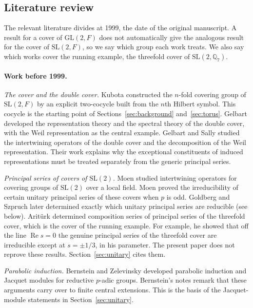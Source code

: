 \documentclass[12pt,letterpaper]{article}
\numberwithin{equation}{section}
\theoremstyle{plain}
\theoremstyle{definition}
\theoremstyle{remark}
\newcommand{\Qq}{\mathbb Q}
\newcommand{\SL}{\mathrm{SL}}
\newcommand{\GL}{\mathrm{GL}}
\begin{document}
\subsection{Literature review}\label{sec:literature}
The relevant literature divides at 1999, the date of the original
manuscript. A result for a cover of $\GL(2,F)$ does not automatically
give the analogous result for the cover of $\SL(2,F)$, so we say which
group each work treats. We also say which works cover the running
example, the threefold cover of $\SL(2,\Qq_7)$.

\paragraph{Work before 1999.}
\emph{The cover and the double cover.} Kubota \cite{Ku67}
constructed the $n$-fold covering group of $\SL(2,F)$ by an explicit
two-cocycle built from the $n$th Hilbert symbol. This cocycle is the
starting point of Sections~\ref{sec:background} and~\ref{sec:torus}.
Gelbart \cite{Ge76} developed the representation theory and the
spectral theory of the double cover, with the Weil representation as
the central example. Gelbart and Sally \cite{GS75} studied the
intertwining operators of the double cover and the decomposition of
the Weil representation. Their work explains why the exceptional
constituents of induced representations must be treated separately
from the generic principal series.

\emph{Principal series of covers of $\SL(2)$.} Moen \cite{Mo}
studied intertwining operators for covering groups of $\SL(2)$ over a
local field. Moen \cite{Mo88} proved the irreducibility of certain
unitary principal series of these covers when $p$ is odd. Goldberg and
Szpruch later determined exactly which unitary principal series are
reducible (see below). Arit\"urk \cite{Ar80} determined composition
series of principal series of the threefold cover, which is the cover
of the running example. For example, he showed that off the line
$\operatorname{Re}s=0$ the genuine principal series of the threefold
cover are irreducible except at $s=\pm1/3$, in his parameter. The
present paper does not reprove these results.
Section~\ref{sec:unitary} cites them.

\emph{Parabolic induction.} Bernstein and Zelevinsky
\cite{BZ76,BZ77} developed parabolic induction and Jacquet modules for
reductive $p$-adic groups. Bernstein's notes \cite{BD84} remark that
these arguments carry over to finite central extensions. This is the
basis of the Jacquet-module statements in Section~\ref{sec:unitary}.
\end{document}
